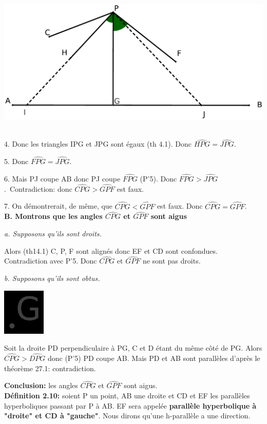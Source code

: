 \documentclass[a4paper, 12pt, twoside]{book}
\begin{document}
     \includegraphics[scale=0.2]{figures/Lobat4.eps}\
     
     4. Donc les triangles IPG et JPG sont égaux (th 4.1). Donc  $\hat{HPG}=\hat{JPG}$.\
     
     5. Donc $\hat{FPG}=\hat{JPG}$.\
     
     6. Mais PJ coupe AB donc PJ coupe $\hat{FPG}$ (P'5). Donc $\hat{FPG}>\hat{JPG}$.\ Contradiction: donc $\hat{CPG}>\hat{GPF}$ est faux.\
     
     7. On démontrerait, de même, que $\hat{CPG}<\hat{GPF}$ est faux. Donc $\hat{CPG}=\hat{GPF}$.\\
     
     \textbf{B. Montrons que les angles  $\hat{CPG}$ et $\hat{GPF}$ sont aigus}\
     
     \textit{a. Supposons qu'ils sont droits.}\
     
     Alors (th14.1) C, P, F sont alignés donc EF et CD sont confondues. Contradiction avec P'5. Donc  $\hat{CPG}$ et $\hat{GPF}$ ne sont pas droits.\
     
       \textit{b. Supposons qu'ils sont obtus.}\
       
        \includegraphics[scale=0.2]{figures/Lobat5.eps}\
        
        Soit la droite PD perpendiculaire à PG, C et D étant du même côté de PG. Alors  $\hat{CPG}>\hat{DPG}$ donc (P'5) PD coupe AB. Mais PD et AB sont parallèles d'après le théorème 27.1: contradiction.\
        
        \textbf{Conclusion:} les angles  $\hat{CPG}$ et $\hat{GPF}$ sont aigus.\\
        
        \textbf{Définition 2.10:} soient P un point, AB une droite et CD et EF les parallèles hyperboliques passant par P à AB. EF sera appelée  \textbf{parallèle hyperbolique à "droite" et CD à "gauche"}. Nous dirons qu'une h-parallèle a une direction.\\
        
\end{document}
